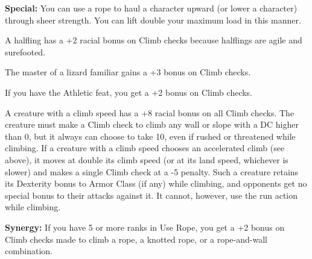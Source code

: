 \textbf{Special:} You can use a rope to haul a character upward (or lower a character) through sheer strength. You can lift double your maximum load in this manner.

A halfling has a +2 racial bonus on Climb checks because halflings are agile and surefooted.

The master of a lizard familiar gains a +3 bonus on Climb checks.

If you have the Athletic feat, you get a +2 bonus on Climb checks.

A creature with a climb speed has a +8 racial bonus on all Climb checks. The creature must make a Climb check to climb any wall or slope with a DC higher than 0, but it always can choose to take 10, even if rushed or threatened while climbing. If a creature with a climb speed chooses an accelerated climb (see above), it moves at double its climb speed (or at its land speed, whichever is slower) and makes a single Climb check at a -5 penalty. Such a creature retains its Dexterity bonus to Armor Class (if any) while climbing, and opponents get no special bonus to their attacks against it. It cannot, however, use the run action while climbing.

\textbf{Synergy:} If you have 5 or more ranks in Use Rope, you get a +2 bonus on Climb checks made to climb a rope, a knotted rope, or a rope-and-wall combination.
